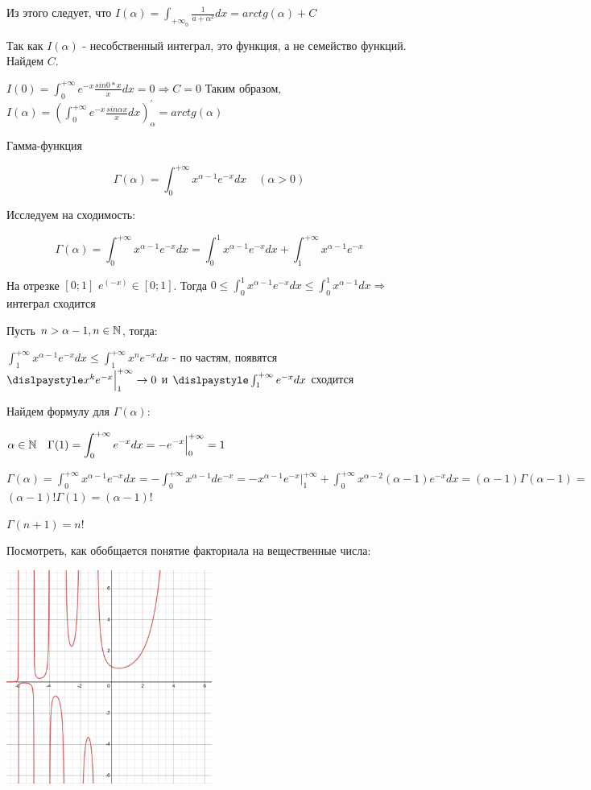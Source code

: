 \documentclass[12pt]{article}
\begin{document}
    Из этого следует, что $\displaystyle I(\alpha) = \int_{+\infty}_{0} \frac{1}{a + \alpha^2} dx = arctg(\alpha) + C$

    Так как $I(\alpha)$ - несобственный интеграл, это функция, а не семейство функций. Найдем $C$.

    $\displaystyle I(0) = \int^{+\infty}_0 e^{-x} \frac{sin 0 * x}{x}dx = 0 \Longrightarrow C = 0$
    Таким образом, $\displaystyle I(\alpha) = (\int^{+\infty}_0 e^{-x} \frac{sin\alpha x}{x} dx)^\prime_\alpha = arctg(\alpha)$

    \Ex Гамма-функция

    \[\Gamma(\alpha) = \int^{+\infty}_0 x^{\alpha - 1} e^{-x} dx \quad (\alpha > 0)\]

    Исследуем на сходимость:

    \[\Gamma(\alpha) = \int^{+\infty}_0 x^{\alpha - 1} e^{-x} dx = \int^{1}_0 x^{\alpha - 1} e^{-x} dx + \int^{+\infty}_1 x^{\alpha - 1} e^{-x}\]

    На отрезке $[0; 1]$ $e^(-x) \in [0;1]$.
    Тогда $\displaystyle 0 \leq \int^{1}_0 x^{\alpha - 1} e^{-x} dx \leq \int^{1}_0 x^{\alpha - 1} dx \Longrightarrow$ интеграл сходится

    Пусть $n > \alpha - 1, n \in \mathbb{N}$, тогда:

    $\displaystyle \int^{+\infty}_1 x^{\alpha - 1} e^{-x} dx \leq \int^{+\infty}_1 x^{n} e^{-x} dx$ - по частям, появятся $\dislpaystyle x^{k} e^{-x} \Big|^{+\infty}_1 \rightarrow 0$ и $\dislpaystyle \int^{+\infty}_1 e^{-x} dx$ сходится

    Найдем формулу для $\Gamma(\alpha)$:

    $\displaystyle \alpha \in \mathbb{N} \quad \Gamma(1) = \int^{+\infty}_0 e^{-x} dx = -e^{-x} \Big|^{+\infty}_{0} = 1$

    $\displaystyle \Gamma(\alpha) = \int^{+\infty}_0 x^{\alpha - 1} e^{-x} dx = -\int^{+\infty}_0 x^{\alpha - 1} de^{-x} = -x^{\alpha - 1}e^{-x} \Big|^{+\infty}_1 + \int^{+\infty}_0 x^{\alpha - 2} (\alpha - 1) e^{-x} dx = (\alpha - 1) \Gamma(\alpha - 1) = $
    $(\alpha - 1)! \Gamma(1) = (\alpha - 1)!$

    $\Gamma(n + 1) = n!$

    \Lab Посмотреть, как обобщается понятие факториала на вещественные числа:

    \includegraphics[height=70mm]{images/calculus_2024_02_28_1}
\end{document}
